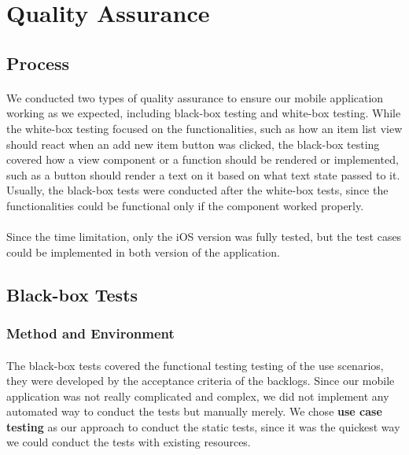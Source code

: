 \documentclass[12pt,a4paper]{article}
\begin{document}
    \section{Quality Assurance} %
      \label{chapter:Quality Assurance}
      
      \subsection{Process} %
        \paragraph{} We conducted two types of quality assurance to ensure our mobile application working as we expected, including black-box testing and white-box testing. While the white-box testing focused on the functionalities, such as how an item list view should react when an add new item button was clicked, the black-box testing covered how a view component or a function should be rendered or implemented, such as a button should render a text on it based on what text state passed to it. Usually, the black-box tests were conducted after the white-box tests, since the functionalities could be functional only if the component worked properly. 

        \paragraph{} Since the time limitation, only the iOS version was fully tested, but the test cases could be implemented in both version of the application.

      \subsection{Black-box Tests}
        \subsubsection{Method and Environment} %
          \paragraph{} The black-box tests covered the functional testing testing of the use scenarios, they were developed by the acceptance criteria of the backlogs. Since our mobile application was not really complicated and complex, we did not implement any automated way to conduct the tests but manually merely. We chose {\bf use case testing} as our approach to conduct the static tests, since it was the quickest way we could conduct the tests with existing resources.
          
\end{document}
